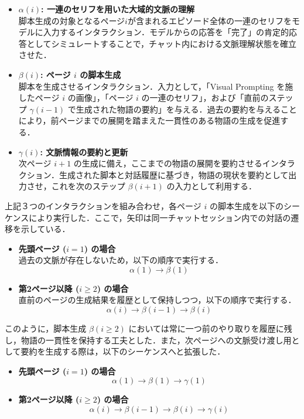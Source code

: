 \documentclass[a4j,12pt]{jsreport}
\begin{document}
\begin{itemize}
   \item \textbf{$\alpha(i)$: 一連のセリフを用いた大域的文脈の理解 } \\
         脚本生成の対象となるページ$i$が含まれるエピソード全体の一連のセリフをモデルに入力するインタラクション．モデルからの応答を「完了」の肯定的応答としてシミュレートすることで，チャット内における文脈理解状態を確立させた．

   \item \textbf{$\beta(i)$: ページ $i$ の脚本生成 } \\
         脚本を生成させるインタラクション．入力として，「Visual Prompting を施したページ $i$ の画像」，「ページ $i$ の一連のセリフ」，および「直前のステップ $\gamma(i-1)$ で生成された物語の要約」を与える．過去の要約を与えることにより，前ページまでの展開を踏まえた一貫性のある物語の生成を促進する．

   \item \textbf{$\gamma(i)$: 文脈情報の要約と更新 } \\
         次ページ $i+1$ の生成に備え，ここまでの物語の展開を要約させるインタラクション．生成された脚本と対話履歴に基づき，物語の現状を要約として出力させ，これを次のステップ $\beta(i+1)$ の入力として利用する．
\end{itemize}

上記３つのインタラクションを組み合わせ，各ページ $i$ の脚本生成を以下のシーケンスにより実行した．ここで，矢印は同一チャットセッション内での対話の遷移を示している．

\begin{itemize}
   \item \textbf{先頭ページ ($i=1$) の場合} \\
         過去の文脈が存在しないため，以下の順序で実行する．
         \[
            \alpha(1) \rightarrow \beta(1)
         \]
   \item \textbf{第2ページ以降 ($i \ge 2$) の場合} \\
         直前のページの生成結果を履歴として保持しつつ，以下の順序で実行する．
         \[
            \alpha(i) \rightarrow \beta(i-1) \rightarrow \beta(i)
         \]
\end{itemize}
このように，脚本生成 $\beta(i \ge 2)$ においては常に一つ前のやり取りを履歴に残し，物語の一貫性を保持する工夫とした．また，次ページへの文脈受け渡し用として要約を生成する際は，以下のシーケンスへと拡張した．
\begin{itemize}
   \item \textbf{先頭ページ ($i=1$) の場合}
         \[
            \alpha(1) \rightarrow \beta(1) \rightarrow \gamma(1)
         \]
   \item \textbf{第2ページ以降 ($i \ge 2$) の場合}
         \[
            \alpha(i) \rightarrow \beta(i-1) \rightarrow \beta(i) \rightarrow \gamma(i)
         \]
\end{itemize}
\end{document}
